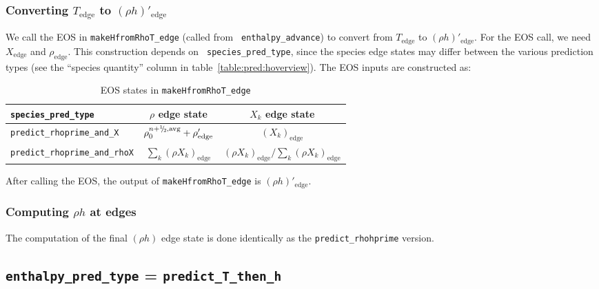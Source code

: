 \subsubsection{Converting $T_\mathrm{edge}$ to $(\rho h)'_\mathrm{edge}$}

We call the EOS in {\tt makeHfromRhoT\_edge} (called from {\tt
  enthalpy\_advance}) to convert from $T_\mathrm{edge}$ to $(\rho
h)'_\mathrm{edge}$.  For the EOS call, we need $X_\mathrm{edge}$ and
$\rho_\mathrm{edge}$.  This construction depends on {\tt
  species\_pred\_type}, since the species edge states may differ
between the various prediction types (see the ``species quantity''
column in table~\ref{table:pred:hoverview}).  The EOS inputs are
constructed as:

\begin{table*}[h]
\centering
\caption{EOS states in {\tt makeHfromRhoT\_edge}\newline}
\label{table:pred:EOSinputs}
\renewcommand{\arraystretch}{1.5}
\begin{tabular}{l|c|c}
\hline
\hline
{\tt species\_pred\_type} & {$\rho$ edge state} &   {$X_k$ edge state}  \\
\hline
{\tt predict\_rhoprime\_and\_X} & 
  $\rho_0^{n+\myhalf,\rm{avg}} + \rho'_\mathrm{edge}$ & 
  $(X_k)_\mathrm{edge}$ \\
{\tt predict\_rhoprime\_and\_rhoX} & 
  $\sum_k (\rho X_k)_\mathrm{edge}$ & 
  $(\rho X_k)_\mathrm{edge}/\sum_k (\rho X_k)_\mathrm{edge}$ \\
\hline
\end{tabular}
\end{table*}

After calling the EOS, the output of {\tt makeHfromRhoT\_edge} is
$(\rho h)'_\mathrm{edge}$.

\subsubsection{Computing $\rho h$ at edges}

The computation of the final $(\rho h)$ edge state is done identically
as the {\tt predict\_rhohprime} version.



\subsection{{\tt enthalpy\_pred\_type} = {\tt predict\_T\_then\_h}}

